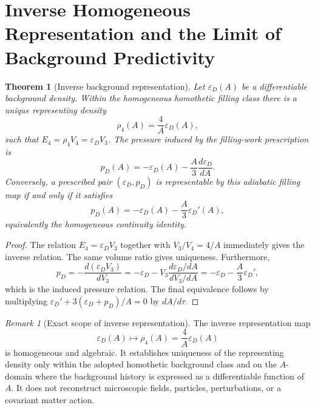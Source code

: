 \documentclass[11pt,a4paper]{article}
\def\dd{d}%
\numberwithin{equation}{section}
\newtheorem{theorem}[criterion]{Theorem}
\theoremstyle{remark}
\newtheorem{remark}[criterion]{Remark}
\newcommand{\Efour}{E_4}
\newcommand{\rhoFour}{\rho_4}
\newcommand{\epsD}{\varepsilon_D}
\newcommand{\pD}{p_D}
\newcommand{\dd}{\mathrm{d}}
\begin{document}
\section{Inverse Homogeneous Representation and the Limit of Background Predictivity}
\begin{theorem}[Inverse background representation]
Let \(\epsD(A)\) be a differentiable background density. Within the homogeneous homothetic filling class there is a unique representing density
\begin{equation}
\rhoFour(A)=\frac{4}{A}\epsD(A),
\end{equation}
such that \(\Efour=\rhoFour V_4=\epsD V_3\). The pressure induced by the filling-work prescription is
\begin{equation}
\pD(A)=-\epsD(A)-\frac{A}{3}\frac{\dd\epsD}{\dd A}.
\end{equation}
Conversely, a prescribed pair \((\epsD,\pD)\) is representable by this adiabatic filling map if and only if it satisfies
\begin{equation}
\pD(A)=-\epsD(A)-\frac{A}{3}\epsD'(A),
\end{equation}
equivalently the homogeneous continuity identity.
\end{theorem}
\begin{proof}
The relation \(\Efour=\epsD V_3\) together with \(V_3/V_4=4/A\) immediately gives the inverse relation. The same volume ratio gives uniqueness. Furthermore,
\begin{equation}
\pD=-\frac{\dd(\epsD V_3)}{\dd V_3}
=-\epsD-V_3\frac{\dd\epsD/\dd A}{\dd V_3/\dd A}
=-\epsD-\frac{A}{3}\epsD',
\end{equation}
which is the induced pressure relation. The final equivalence follows by multiplying \(\epsD'+3(\epsD+\pD)/A=0\) by \(\dd A/\dd\tau\).
\end{proof}

\begin{remark}[Exact scope of inverse representation]
The inverse representation map
\begin{equation}
\epsD(A)\longmapsto \rhoFour(A)=\frac{4}{A}\epsD(A)
\end{equation}
is homogeneous and algebraic. It establishes uniqueness of the representing density only within the adopted homothetic background class and on the \(A\)-domain where the background history is expressed as a differentiable function of \(A\). It does not reconstruct microscopic fields, particles, perturbations, or a covariant matter action.
\end{remark}
\end{document}
